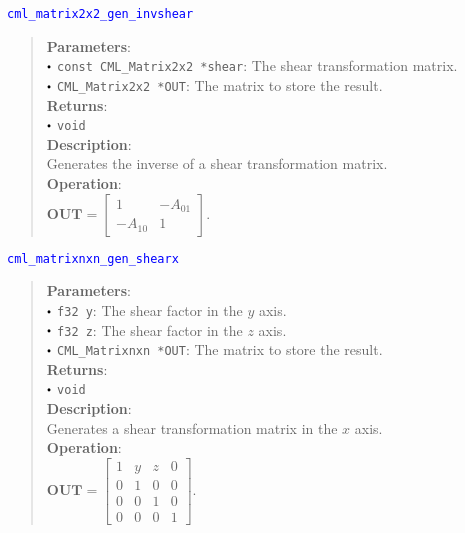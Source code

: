 \documentclass[a4paper,oneside,8pt]{extarticle}
\newcommand{\function}[1]{
  \noindent\textcolor{blue}{\texttt{#1}}
  \vspace{-0.3em}
}
\renewcommand{\dot}{\raisebox{0.3ex}{\scalebox{0.6}{$\bullet$}}}
\theoremstyle{definition}
\begin{document}
\function{cml\_matrix2x2\_gen\_invshear}
\begin{quote}
  \textbf{Parameters}: \\
  $\dot$ \texttt{const CML\_Matrix2x2 *shear}: The shear transformation matrix. \\
  $\dot$ \texttt{CML\_Matrix2x2 *OUT}: The matrix to store the result. \\
  \textbf{Returns}: \\
  $\dot$ \texttt{void} \\

  \vspace{-0.75em}
  \textbf{Description}: \\
  Generates the inverse of a shear transformation matrix. \\

  \vspace{-0.75em}
  \textbf{Operation}: \\
  $\mathbf{OUT} = \begin{bmatrix}
  1 & -A_{01} \\
  -A_{10} & 1
  \end{bmatrix}$. \\
\end{quote}

\function{cml\_matrixnxn\_gen\_shearx}
\begin{quote}
  \textbf{Parameters}: \\
  $\dot$ \texttt{f32 y}: The shear factor in the $y$ axis. \\
  $\dot$ \texttt{f32 z}: The shear factor in the $z$ axis. \\
  $\dot$ \texttt{CML\_Matrixnxn *OUT}: The matrix to store the result. \\
  \textbf{Returns}: \\
  $\dot$ \texttt{void} \\

  \vspace{-0.75em}
  \textbf{Description}: \\
  Generates a shear transformation matrix in the $x$ axis. \\

  \vspace{-0.75em}
  \textbf{Operation}: \\
  $\mathbf{OUT} = \begin{bmatrix}
  1 & y & z & 0 \\
  0 & 1 & 0 & 0 \\
  0 & 0 & 1 & 0 \\
  0 & 0 & 0 & 1
  \end{bmatrix}$. \\
\end{quote}
\end{document}
